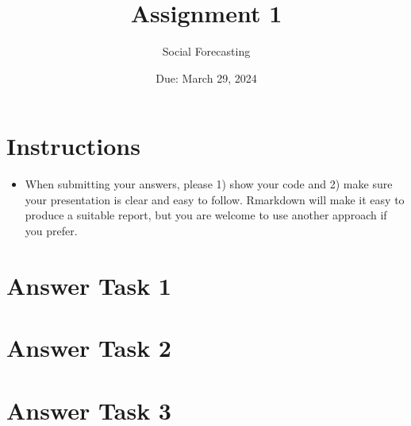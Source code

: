 \documentclass[12pt,letterpaper]{article}
\title{Assignment 1}
\date{Due: March 29, 2024}
\author{Social Forecasting}
\begin{document}
	\maketitle
	\section*{Instructions}
	\begin{itemize}
	\item 
	When submitting your answers, please 1) show your code and 2) make sure your presentation is clear and easy to follow. Rmarkdown will make it easy to produce a suitable report, but you are welcome to use another approach if you prefer.
	\end{itemize}

	\vspace{.25cm}
\section*{Answer Task 1}
\vspace{.25cm}

\begin{enumerate}
	
		 
\end{enumerate}
		
		\vspace{.25cm}
	\section*{Answer Task 2}
	\vspace{.25cm}
	
	\begin{enumerate}
		
		 
	\end{enumerate}	
	
		\vspace{.25cm}
\section*{Answer Task 3}
\vspace{.25cm}

\begin{enumerate}
	 
\end{enumerate}		
	
\end{document}
